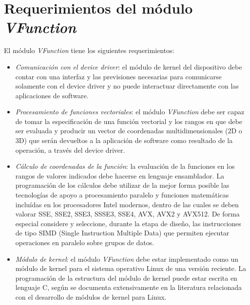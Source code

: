 \documentclass[12pt,letterpaper]{article}
\begin{document}
 
\section*{Requerimientos del módulo \textit{VFunction}}
El módulo \textit{VFunction} tiene los siguientes requerimientos:
\begin{itemize}
\item \textit{Comunicación con el device driver}: el módulo de kernel del dispositivo debe contar con una interfaz y las previsiones necesarias para comunicarse solamente con el device driver y no puede interactuar directamente con las aplicaciones de software.
\item \textit{Procesamiento de funciones vectoriales}: el módulo \textit{VFunction} debe ser capaz de tomar la especificación de una función vectorial y los rangos en que debe ser evaluada y producir un vector de coordenadas multidimensionales (2D o 3D) que serán devueltos a la aplicación de software como resultado de la operación, a través del device driver.
\item \textit{Cálculo de coordenadas de la función}: la evaluación de la funciones en los rangos de valores indicados debe hacerse en lenguaje ensamblador. La programación de los cálculos debe utilizar de la mejor forma posible las tecnologías de apoyo a procesamiento paralelo y funciones matemáticas incluídas en los procesadores Intel modernos, dentro de las cuales se deben valorar SSE, SSE2, SSE3, SSSE3, SSE4, AVX, AVX2 y AVX512. De forma especial considere y seleccione, durante la etapa de diseño, las instrucciones de tipo SIMD (Single Instruction Multiple Data) que permiten ejecutar operaciones en paralelo sobre grupos de datos.
\item \textit{Módulo de kernel}: el módulo \textit{VFunction} debe estar implementado como un módulo de kernel para el sistema operativo Linux de una versión reciente. La programación de la estructura del módulo de kernel puede estar escrita en lenguaje C, según se documenta extensivamente en la literatura relacionada con el desarrollo de módulos de kernel para Linux.
\end{itemize}
\end{document}
